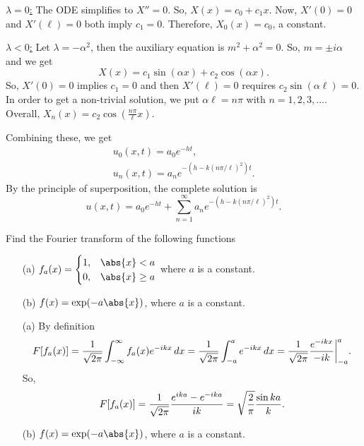 \documentclass[11pt]{penrose}
\begin{document}
\begin{problem}{1}
    \underline{$\lambda = 0$:} The ODE simplifies to $X'' = 0$. So, $X(x) = c_0 + c_1 x$. Now, $X'(0) = 0$ and $X'(\ell) = 0$ both imply $c_1 = 0$. Therefore, $X_0(x) = c_0$, a constant.

    \underline{$\lambda < 0$:} Let $\lambda = - \alpha^2$, then the auxiliary equation is $m^2 + \alpha^2 = 0$. So, $m = \pm i\alpha$ and we get
    \begin{equation*}
        X(x) = c_1 \sin(\alpha x) + c_2 \cos(\alpha x).
    \end{equation*}
    So, $X'(0) = 0$ implies $c_1 = 0$ and then $X'(\ell) = 0$ requires $c_2 \sin(\alpha\ell) = 0$. In order to get a non-trivial solution, we put $\alpha\ell = n\pi$ with $n = 1,2,3,\dots$. Overall, $X_n(x) = c_2 \cos(\frac{n\pi}{\ell} x)$.

    Combining these, we get
    \begin{gather*}
        u_0(x,t) = a_0 e^{-ht},\\
        u_n(x,t) = a_n e^{-(h - k(n\pi/\ell)^2)t}.
    \end{gather*}
    By the principle of superposition, the complete solution is
    \begin{equation*}
        u(x,t) = a_0 e^{-ht} + \sum_{n=1}^{\infty} a_n e^{-(h - k(n\pi/\ell)^2)t}.
    \end{equation*}
\end{problem}

\begin{problem}{2}
    Find the Fourier transform of the following functions
    \begin{enumerate}
        \item[(a)] $f_a(x) = \begin{cases} 1, &\abs{x} < a \\ 0, &\abs{x} \geq a \end{cases}$ where $a$ is a constant.
        \item[(b)] $f(x) = \exp(-a \abs{x})$, where $a$ is a constant.
    \end{enumerate}
    
    \solution
    \begin{enumerate}
        \item[(a)] By definition
        \begin{equation*}
            F[f_a(x)]
            = \frac{1}{\sqrt{2\pi}} \int_{-\infty}^{\infty} f_a(x) e^{-ikx} \,dx
            = \frac{1}{\sqrt{2\pi}} \int_{-a}^{a} e^{-ikx} \,dx
            = \frac{1}{\sqrt{2\pi}} \frac{e^{-ikx}}{-ik} \at[\bigg]{-a}^{a}.
        \end{equation*}
        So,
        \begin{equation*}
            F[f_a(x)]
            = \frac{1}{\sqrt{2\pi}} \frac{e^{ika} - e^{-ika}}{ik}\\
            = \sqrt{\frac{2}{\pi}} \frac{\sin{ka}}{k}.
        \end{equation*}
        \item[(b)] $f(x) = \exp(-a \abs{x})$, where $a$ is a constant.
    \end{enumerate}
\end{problem}
\end{document}

